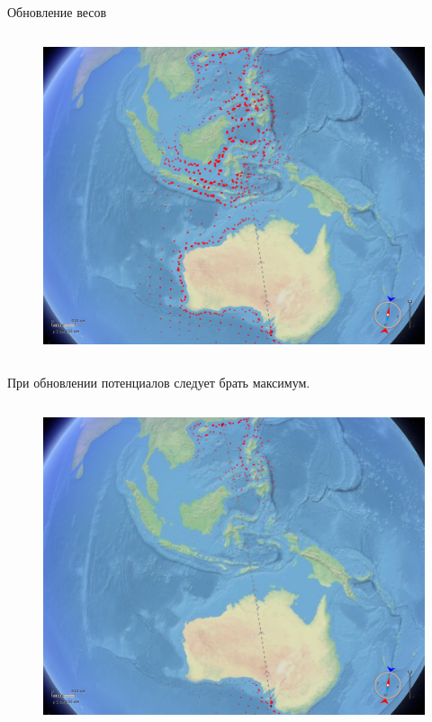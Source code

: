 \documentclass[russian, hyperref={unicode}]{beamer}
\begin{document}
\begin{frame}[noframenumbering]{Обновление весов}
{\begin{columns}
            \begin{figure}
                \includegraphics[clip=true, trim = 280pt 0 20pt 0, width=\textwidth]{Solution/potentials-update/max1}
            \end{figure}
        \end{columns}

        \begin{center}
            При обновлении потенциалов следует брать максимум.
        \end{center}
    }
   
     {
        \begin{columns}
            \begin{figure}
                \includegraphics[clip=true, trim = 280pt 0 20pt 0, width=\textwidth]{Solution/potentials-update/accum2}
            \end{figure}


\end{columns}}
\end{frame}
\end{document}
